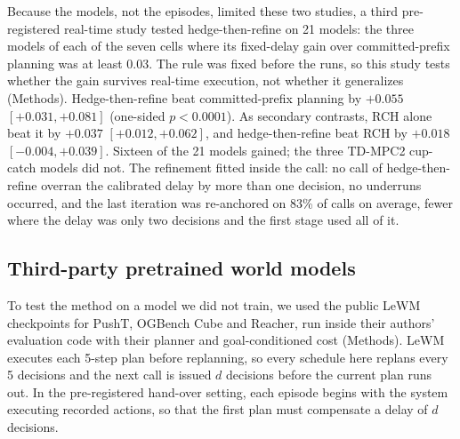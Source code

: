 \documentclass[aps,physrev,\manuscriptlayout,superscriptaddress,
  longbibliography,amsmath,amssymb]{revtex4-2}
\begin{document}
Because the models, not the episodes, limited these two studies, a third pre-registered real-time study tested hedge-then-refine on 21 models: the three models of each of the seven cells where its fixed-delay gain over committed-prefix planning was at least 0.03. The rule was fixed before the runs, so this study tests whether the gain survives real-time execution, not whether it generalizes (Methods). Hedge-then-refine beat committed-prefix planning by $+0.055$ $[+0.031, +0.081]$ (one-sided $p<0.0001$). As secondary contrasts, RCH alone beat it by $+0.037$ $[+0.012, +0.062]$, and hedge-then-refine beat RCH by $+0.018$ $[-0.004, +0.039]$. Sixteen of the 21 models gained; the three TD-MPC2 cup-catch models did not. The refinement fitted inside the call: no call of hedge-then-refine overran the calibrated delay by more than one decision, no underruns occurred, and the last iteration was re-anchored on 83\% of calls on average, fewer where the delay was only two decisions and the first stage used all of it.

\subsection{Third-party pretrained world models}\label{sec:lewm}

To test the method on a model we did not train, we used the public LeWM checkpoints for PushT, OGBench Cube and Reacher\cite{maes2026lewm}, run inside their authors' evaluation code with their planner and goal-conditioned cost (Methods). LeWM executes each 5-step plan before replanning, so every schedule here replans every 5 decisions and the next call is issued $d$ decisions before the current plan runs out. In the pre-registered hand-over setting, each episode begins with the system executing recorded actions, so that the first plan must compensate a delay of $d$ decisions.
\end{document}

